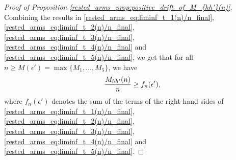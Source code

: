 \begin{proof}[Proof of Proposition \ref{rested_arms_prop:positive_drift_of_M_{hh'}(n)}]
Combining the results in \eqref{rested_arms_eq:liminf_t_1(n)/n_final}, \eqref{rested_arms_eq:liminf_t_2(n)/n_final}, \eqref{rested_arms_eq:liminf_t_3(n)/n_final}, \eqref{rested_arms_eq:liminf_t_4(n)/n_final} and \eqref{rested_arms_eq:liminf_t_5(n)/n_final}, we get that for all $n\geq M(\epsilon')=\max\{M_1,\dots,M_5\}$, we have
\begingroup\allowdisplaybreaks\begin{align}
	\frac{M_{hh'}(n)}{n}\geq f_{n}(\epsilon'),\label{rested_arms_eq:liminf_M_{hh'}(n)/n_1}
\end{align}\endgroup
where $f_n(\epsilon')$ denotes the sum of the terms of the right-hand sides of \eqref{rested_arms_eq:liminf_t_1(n)/n_final}, \eqref{rested_arms_eq:liminf_t_2(n)/n_final}, \eqref{rested_arms_eq:liminf_t_3(n)/n_final}, \eqref{rested_arms_eq:liminf_t_4(n)/n_final} and \eqref{rested_arms_eq:liminf_t_5(n)/n_final}.


\end{proof}

